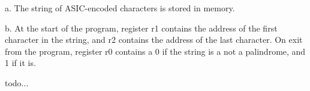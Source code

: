 \documentclass[letterpaper,12pt,titlepage]{article}
\begin{document}
a. The string of ASIC-encoded characters is stored in memory.

b. At the start of the program, register r1 contains the address of the first character in the string, and r2 contains the address of the last character. On exit from the program, register r0 contains a 0 if the string is a not a palindrome, and 1 if it is. \newline

\begin{mdframed}[style=MyFrame]
todo...
\end{mdframed}



\end{document}
